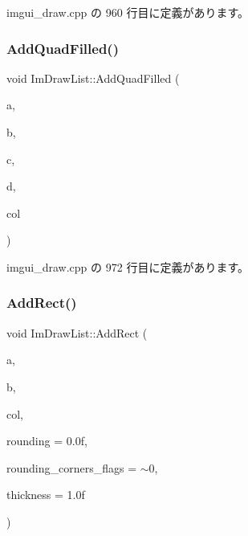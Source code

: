  imgui\+\_\+draw.\+cpp の 960 行目に定義があります。

\mbox{\label{struct_im_draw_list_abefdc71c2dc6b6331193aee3ff680ed0}} 
\subsubsection{\texorpdfstring{Add\+Quad\+Filled()}{AddQuadFilled()}}
{\footnotesize\ttfamily void Im\+Draw\+List\+::\+Add\+Quad\+Filled (\begin{DoxyParamCaption}\item[{const \mbox{\hyperlink{struct_im_vec2}{Im\+Vec2}} \&}]{a,  }\item[{const \mbox{\hyperlink{struct_im_vec2}{Im\+Vec2}} \&}]{b,  }\item[{const \mbox{\hyperlink{struct_im_vec2}{Im\+Vec2}} \&}]{c,  }\item[{const \mbox{\hyperlink{struct_im_vec2}{Im\+Vec2}} \&}]{d,  }\item[{\mbox{\hyperlink{imgui_8h_a118cff4eeb8d00e7d07ce3d6460eed36}{Im\+U32}}}]{col }\end{DoxyParamCaption})}



 imgui\+\_\+draw.\+cpp の 972 行目に定義があります。

\mbox{\label{struct_im_draw_list_a6738c7d0b696273a37808554e1f15a0a}} 
\subsubsection{\texorpdfstring{Add\+Rect()}{AddRect()}}
{\footnotesize\ttfamily void Im\+Draw\+List\+::\+Add\+Rect (\begin{DoxyParamCaption}\item[{const \mbox{\hyperlink{struct_im_vec2}{Im\+Vec2}} \&}]{a,  }\item[{const \mbox{\hyperlink{struct_im_vec2}{Im\+Vec2}} \&}]{b,  }\item[{\mbox{\hyperlink{imgui_8h_a118cff4eeb8d00e7d07ce3d6460eed36}{Im\+U32}}}]{col,  }\item[{float}]{rounding = {\ttfamily 0.0f},  }\item[{int}]{rounding\+\_\+corners\+\_\+flags = {\ttfamily $\sim$0},  }\item[{float}]{thickness = {\ttfamily 1.0f} }\end{DoxyParamCaption})}



